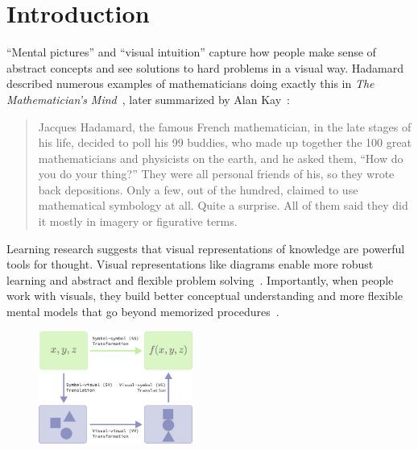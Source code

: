 \documentclass[12pt]{cmuthesis}
\begin{document}
\chapter{Introduction}

``Mental pictures'' and ``visual intuition'' capture how people make sense of abstract concepts and see solutions to hard problems in a visual way. Hadamard described numerous examples of mathematicians doing exactly this in \emph{The Mathematician's Mind}~\cite{Hadamard1997a}, later summarized by Alan Kay~\cite{doingWithImages}:

\begin{quote}
Jacques Hadamard, the famous French mathematician, in the late stages of his life, decided to poll his 99 buddies, who made up together the 100 great mathematicians and physicists on the earth, and he asked them, ``How do you do your thing?'' They were all personal friends of his, so they wrote back depositions. Only a few, out of the hundred, claimed to use mathematical symbology at all. Quite a surprise. All of them said they did it mostly in imagery or figurative terms.
\end{quote}

Learning research suggests that visual representations of knowledge are powerful tools for thought. Visual representations like diagrams enable more robust learning \cite{multimediaLearning} and abstract and flexible problem solving~\cite{Koedinger1990a, pictureAlgebra, DiagramsThousandWords}. Importantly, when people work with visuals, they build better conceptual understanding and more flexible mental models that go beyond memorized procedures~\cite{multipleReps}.

\setlength{\columnsep}{1em}
\setlength{\intextsep}{0em}
\begin{figure}
\vspace{-10pt}
  \begin{center}
    \includegraphics[width=0.45\textwidth]{assets/chapter-1/grounding-rectangle.pdf}
  \end{center}
\end{figure}
\end{document}
